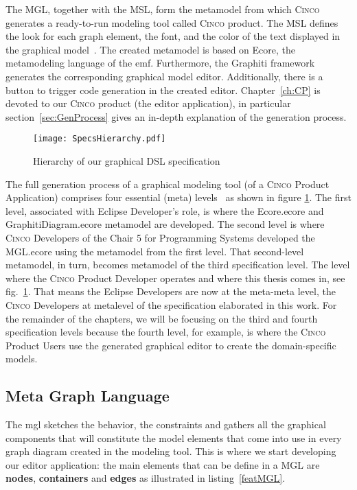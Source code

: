 The MGL, together with the MSL, form the metamodel from which \textsc{Cinco} generates a ready-to-run modeling tool called \textsc{Cinco} product. The MSL defines the look for each graph element, the font, and the color of the text displayed in the graphical model~\cite{naujokat-diss}. The created metamodel is based on Ecore, the metamodeling language of the \gls{emf}. Furthermore, the Graphiti framework generates the corresponding graphical model editor. Additionally, there is a button to trigger code generation in the created editor. Chapter~\ref{ch:CP} is devoted to our \textsc{Cinco} product (the editor application), in particular section~\ref{sec:GenProcess} gives an in-depth explanation of the generation process.

\begin{figure}[h]
    \centering
    \texttt{[image: SpecsHierarchy.pdf]}
    \caption{Hierarchy of our graphical DSL specification}
    \label{fig:modeling-hierachy}
\end{figure}

The full generation process of a graphical modeling tool (of a \textsc{Cinco} Product Application) comprises four essential (meta) levels~\cite{Naujokat2018} as shown in figure \ref{fig:modeling-hierachy}. The first level, associated with Eclipse Developer's role, is where the Ecore.ecore and GraphitiDiagram.ecore metamodel are developed. The second level is where \textsc{Cinco} Developers of the Chair 5 for Programming Systems developed the MGL.ecore using the metamodel from the first level. That second-level metamodel, in turn, becomes metamodel of the third specification level. The level where the \textsc{Cinco} Product Developer operates and where this thesis comes in, see fig.~\ref{fig:modeling-hierachy}. That means the Eclipse Developers are now at the meta-meta level, the \textsc{Cinco} Developers at metalevel of the specification elaborated in this work. For the remainder of the chapters, we will be focusing on the third and fourth specification levels because the fourth level, for example, is where the \textsc{Cinco} Product Users use the generated graphical editor to create the domain-specific models.

\subsection{Meta Graph Language}\label{sec:MGL}

The \gls*{mgl} sketches the behavior, the constraints and gathers all the graphical components that will constitute the model elements that come into use in every graph diagram created in the modeling tool. This is where we start developing our editor application: the main elements that can be define in a MGL are \textbf{nodes}, \textbf{containers} and \textbf{edges} as illustrated in listing~\ref{featMGL}.

